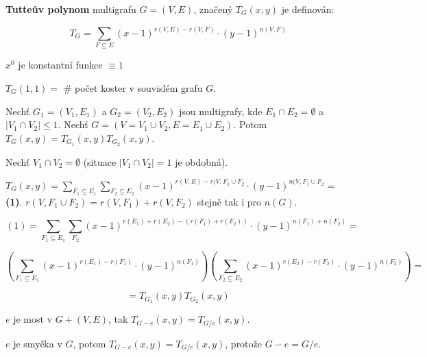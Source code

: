 \begin{definice}
	\textbf{Tutteův polynom} multigrafu $G=(V,E)$, značený $T_{G}(x,y)$ je definován:
	
	$$
	T_{G} = \sum_{F \subseteq E} (x-1)^{r(V,E)-r(V,F)} \cdot (y-1)^{n(V,F)}
	$$
\end{definice}

\begin{pozn}
	$x^{0}$ je konstantní funkce $\equiv 1$
\end{pozn}

\begin{pozor}
	$T_{G}(1,1) =$ \# počet koster v souvislém grafu $G$.
\end{pozor}

\begin{tvrz}
	Nechť $G_{1} =(V_{1},E_{1})$ a $G_{2} = (V_{2},E_{2})$ jsou multigrafy, kde $E_{1} \cap E_{2} = \emptyset$ a $|V_{1} \cap V_{2}| \leq 1$. Nechť $G = (V = V_{1} \cup V_{2}, E = E_{1} \cup E_{2})$. Potom $T_{G}(x,y) = T_{G_{1}}(x,y)T_{G_{2}}(x,y)$.
\end{tvrz}

\begin{dukaz}
	Nechť $V_{1} \cap V_{2} = \emptyset$ (situace $|V_{1} \cap V_{2}| = 1$ je obdobná).
	
	$T_{G}(x,y) = \sum_{F_{1} \subseteq E_{1}} \sum_{F_{2} \subseteq E_{2}} (x-1)^{r(V,E) - r(V, F_{1} \cup F_{2}} \cdot (y-1)^{n(V,F_{1} \cup F_{2}} =$ \textbf{(1)}. $r(V, F_{1} \cup F_{2}) = r(V,F_{1}) + r(V,F_{2})$ stejně tak i pro $n(G)$.
	
	$$
	(1) = \sum_{F_{1} \subseteq E_{1}} \sum_{F_{2}} (x-1)^{r(E_{1})+r(E_{2}) - (r(F_{1}) + r(F_{2}))} \cdot (y-1)^{n(F_{1}) + n(F_{2})} =
	$$
	
	$$
	\left( \sum_{F_{1}\subseteq E_{1}} (x-1)^{r(E_{1}) - r(F_{1})} \cdot (y-1)^{n(F_{1})}\right) \left( \sum_{F_{2}\subseteq E_{2}} (x-1)^{r(E_{2}) - r(F_{2})} \cdot (y-1)^{n(F_{2})} \right) =
	$$
	
	$$
	=T_{G_{1}}(x,y) T_{G_{2}}(x,y)
	$$
\end{dukaz}

\begin{dusl}
	$e$ je most v $G+(V,E)$, tak $T_{G-e}(x,y) = T_{G/e}(x,y)$.
\end{dusl}

\begin{pozor}
	$e$ je smyčka v $G$, potom $T_{G-e}(x,y) = T_{G/e}(x,y)$, protože $G-e = G/e$.
\end{pozor}

